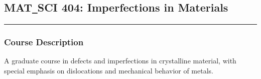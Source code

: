 	\subsection{MAT\texttt{\_}SCI 404: Imperfections in Materials}
	\vspace{-1em} \hfill \rule{0.4\textwidth}{.4pt}\newline
	\null \hfill {} \newline
	\null \hfill {}
\normalfont
	\subsubsection*{Course Description}
	A graduate course in defects and imperfections in crystalline material, with special emphasis on dislocations and mechanical behavior of metals. 
